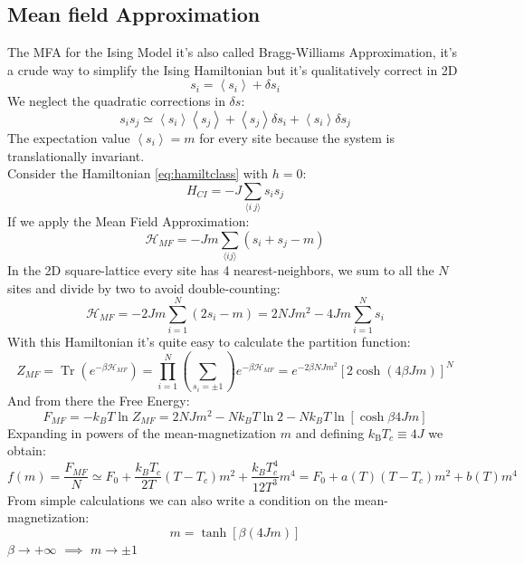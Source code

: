 \documentclass[12pt,a4paper]{article}
\begin{document}
\subsection{Mean field Approximation}\label{MFA}
The MFA for the Ising Model it's also called Bragg-Williams Approximation, it's a crude way to simplify the Ising Hamiltonian but it's qualitatively correct in 2D
\begin{equation}
	s_i =  \left\langle s_{i}\right\rangle +\delta s_i 
\end{equation} 
We neglect the quadratic corrections in $\delta s$:
\begin{equation}
	s_{i} s_{j} \simeq \left\langle s_{i}\right\rangle\left\langle s_{j}\right\rangle+\left\langle s_{j}\right\rangle \delta s_{i}+\left\langle s_{i}\right\rangle \delta s_{j}
\end{equation}
The expectation value $\left\langle s_{i}\right\rangle=m$ for every site because the system is translationally invariant.\\
Consider the Hamiltonian \ref{eq:hamiltclass} with $h=0$:
\begin{equation}
	H_{CI}=-J\sum _{\langle i~j\rangle }s _{i}s _{j}
\end{equation}
If we apply the Mean Field Approximation:
\begin{equation}
	\mathcal{H}_{MF}=-J m \sum_{\langle i j\rangle}\left(s_{i}+s_{j}-m\right)
\end{equation}
In the 2D square-lattice every site has 4 nearest-neighbors, we sum to all the $N$ sites and  divide by two to avoid double-counting:
\begin{equation}
	\mathcal{H}_{MF}=-2 J m \sum_{i=1}^{N}\left(2 s_{i}-m\right) =2N J m^{2}-4 J m \sum_{i=1}^{N} s_i
\end{equation}  
With this Hamiltonian it's quite easy to calculate the partition function:
\begin{equation}
	Z_{MF} =\operatorname{Tr}\left(e^{-\beta \mathcal{H}_{MF}}\right) 
	=\prod_{i=1}^{N}\left(\sum_{s_{i}=\pm 1}\right) e^{-\beta \mathcal{H}_{MF}}=e^{-2 \beta N  J m^{2}}\left[2 \cosh \left(4 \beta Jm\right)\right]^{N}
\end{equation}
And from there the Free Energy:
\begin{equation}
	F_{MF}=-k_B T\ln Z_{MF}=2 N  J m^{2}-N k_B T\ln 2-N k_B T \ln \left[ \cosh \beta  4Jm \right]
\end{equation}
Expanding in powers of the mean-magnetization $m$ and defining $k_{\mathrm{B}} T_{c} \equiv 4 J$ we obtain:
\begin{equation}
	f(m)=\frac{F_{MF}}{N} \simeq F_{0}+\frac{k_BT_c}{2T}\left(T-T_{c}\right) m^{2}+\frac{k_BT_c^4}{12T^3} m^{4}= F_{0}+a(T)\left(T-T_{c}\right) m^{2}+b(T) m^{4}
\end{equation}
From simple calculations we can also write a condition on the mean-magnetization:
\begin{equation}
	m=\tanh [\beta(4J m)]
\end{equation}
$\beta \rightarrow +\infty$ $\implies$ $m\rightarrow \pm 1$
\end{document}
